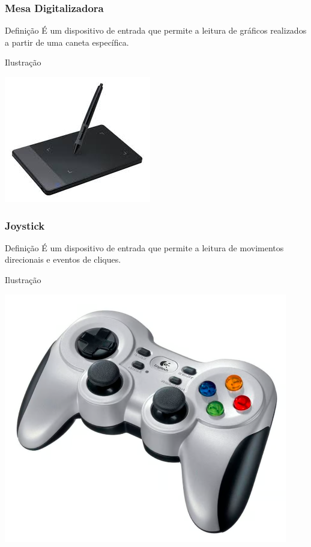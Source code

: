 \documentclass[aspectratio=169]{beamer} %
\begin{document}
\begin{frame}
	\frametitle{Mesa Digitalizadora}
	
	\begin{block}{Defini\c cão}
		É um dispositivo de entrada que permite a leitura de gráficos realizados a partir de uma caneta específica.
	\end{block}\vfill
	
	\begin{exampleblock}{Ilustra\c cão}
		\begin{center}
			\includegraphics[scale=0.5]{img/mesa_digitalizadora}
		\end{center}		
	\end{exampleblock}
\end{frame}

\begin{frame}
	\frametitle{Joystick}
	
	\begin{block}{Defini\c cão}
		É um dispositivo de entrada que permite a leitura de movimentos direcionais e eventos de cliques.
	\end{block}\vfill
	
	\begin{exampleblock}{Ilustra\c cão}
		\begin{center}
			\includegraphics[scale=0.25]{img/joystick}
		\end{center}		
	\end{exampleblock}
\end{frame}
\end{document}
